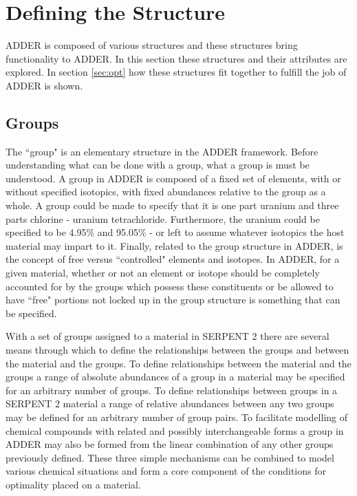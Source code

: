 \documentclass[]{elsarticle}
\begin{document}
\section{Defining the Structure} \label{sec:structure}
ADDER is composed of various structures and these structures bring functionality
to ADDER. In this section these structures and their attributes are explored. In
section \ref{sec:opt} how these structures fit together to fulfill the
job of ADDER is shown.

\subsection{Groups} \label{ssec:groups}
The ``group" is an elementary structure in the ADDER framework. Before
understanding what can be done with a group, what a group is must be understood.
A group in ADDER is composed of a fixed set of elements, with or without
specified isotopics, with fixed abundances relative to the group as a whole.
A group could be made to specify that it is one part uranium and three parts
chlorine - uranium tetrachloride. Furthermore, the uranium could be specified
to be 4.95\%  and 95.05\%  - or left to assume
whatever isotopics the host material may impart to it. 
Finally, related to the group structure in ADDER, is the concept of free versus
``controlled" elements and isotopes. In ADDER, for a given material, whether or
not an element or isotope should be completely accounted for by the groups
which possess these constituents or be allowed to have ``free" portions
not locked up in the group structure is something that can be specified.

With a set of groups assigned to a material in SERPENT 2 there are several means
through which to define the relationships between the groups and between the
material and the groups. To define relationships
between the material and the groups a range of absolute abundances of a group
in a material may be specified for an arbitrary number of groups. 
To define relationships between groups in a SERPENT 2
material a range of relative abundances between any two groups
may be defined for an arbitrary number of group pairs. To facilitate modelling
of chemical compounds with related and possibly interchangeable forms a group
in ADDER may also be formed from the linear combination of any other groups
previously defined. These three simple mechanisms can be combined to model
various chemical situations and form a core component of the conditions for
optimality placed on a material. 
\end{document}
